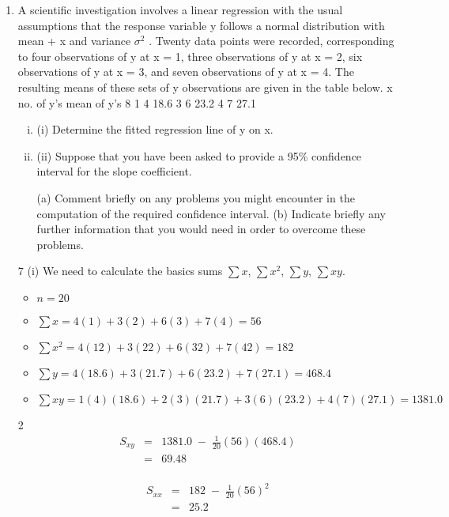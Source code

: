 \documentclass[a4paper,12pt]{article}
\begin{document}
\begin{enumerate}
\item A scientific investigation involves a linear regression with the usual assumptions that the response variable y follows a normal distribution with mean \alpha + \beta x and variance 
$\sigma^2$ . Twenty data points were recorded, corresponding to four observations of y at
x = 1, three observations of y at x = 2, six observations of y at x = 3, and seven observations of y at x = 4. The resulting means of these sets of y observations are
given in the table below.
x
no. of y's
mean of y's
8
1
4
18.6
3
6
23.2
4
7
27.1
\begin{enumerate}[(i)]
\item (i) Determine the fitted regression line of y on x.
\item (ii) Suppose that you have been asked to provide a 95\% confidence interval for
the slope coefficient.

(a) Comment briefly on any problems you might encounter in the computation of the required confidence interval.
(b) Indicate briefly any further information that you would need in order to overcome these problems.
\end{enumerate}

7
(i)
We need to calculate the basics sums $\sum x$, $\sum x^2$, $\sum y$, $\sum xy$.
\begin{itemize}
\item ${ \displaystyle n = 20 }$
\item ${ \displaystyle \sum x = 4(1) + 3(2) + 6(3) + 7(4) = 56 }$
\item ${ \displaystyle \sum x^2 = 4(12) + 3(22) + 6(32) + 7(42) = 182 }$
\item${ \displaystyle   \sum y = 4(18.6) + 3(21.7) + 6(23.2) + 7(27.1) = 468.4 }$
\item ${ \displaystyle  \sum xy = 1(4)(18.6) + 2(3)(21.7) + 3(6)(23.2) + 4(7)(27.1) = 1381.0 }$
\end{itemize}


2
\begin{eqnarray*}
S_{xy} &=& 1381.0 \;-\; \frac{1}{20} (56)(468.4)\\
&=& 69.48\\
\end{eqnarray*}

\begin{eqnarray*}
S_{xx} &=& 182 \;-\;\frac{1}{20} (56)^2\\
&=& 25.2\\
\end{eqnarray*}


\end{enumerate}
\end{document}
